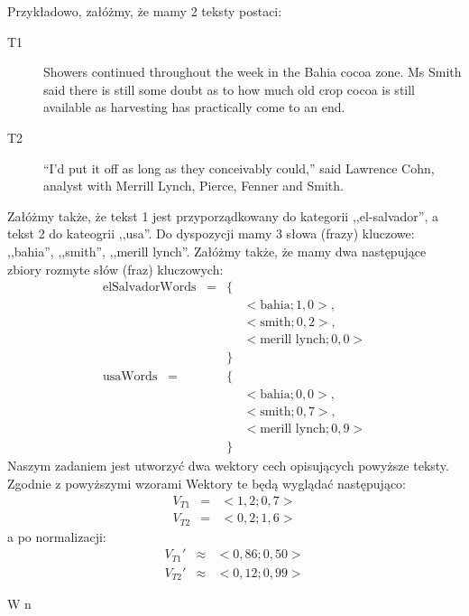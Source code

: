 \documentclass[a4paper]{classrep}
\begin{document}
Przykładowo, załóżmy, że mamy 2 teksty postaci:
\begin{description}
\item [T1]Showers continued throughout the week in the Bahia cocoa zone. Ms Smith said there is still some doubt as to how 
much old crop cocoa is still available as harvesting has practically come to an end.
\item [T2]``I'd put it off as long as they conceivably could,'' said Lawrence Cohn, analyst with Merrill Lynch, Pierce, Fenner and Smith.
\end{description}
Załóżmy także, że tekst 1 jest przyporządkowany do kategorii ,,el-salvador'', a tekst 2 do kateogrii ,,usa''.
Do dyspozycji mamy 3 słowa (frazy) kluczowe: ,,bahia'', ,,smith'', ,,merill lynch''. Załóżmy także, że mamy dwa następujące zbiory rozmyte słów (fraz) kluczowych:
\begin{eqnarray*}
\textrm{elSalvadorWords}\;\;\;= &\{& \\
  && <\textrm{bahia}; 1{,}0>, \\
  && <\textrm{smith}; 0{,}2>, \\
  && <\textrm{merill lynch}; 0{,}0> \\
  &\}& \\
\textrm{usaWords}\;\;\;= &\{& \\
  && <\textrm{bahia}; 0{,}0>, \\
  && <\textrm{smith}; 0{,}7>, \\
  && <\textrm{merill lynch}; 0{,}9> \\
  &\}&
\end{eqnarray*}
Naszym zadaniem jest utworzyć dwa wektory cech opisujących powyższe teksty. Zgodnie z powyższymi wzorami Wektory te będą wyglądać następująco:
\begin{eqnarray*}
V_{T1} &=& <1{,}2; 0{,}7> \\
V_{T2} &=& <0{,}2; 1{,}6>
\end{eqnarray*}
a po normalizacji:
\begin{eqnarray*}
V_{T1}' &\approx& <0{,}86; 0{,}50> \\
V_{T2}' &\approx& <0{,}12; 0{,}99>
\end{eqnarray*}

W n
\end{document}
